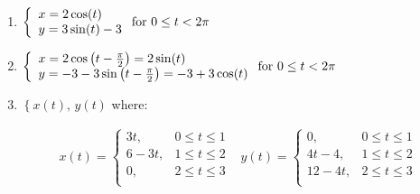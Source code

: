 \documentclass{ximera}
\begin{document}
\begin{enumerate}
\setcounter{enumi}{\value{HW}}

\item   ${\displaystyle \left\{ \begin{array}{l} x = 2\cos(t) \\ y = 3\sin(t)-3  \end{array} \right. \vspace{.25in} \mbox{for } 0 \leq t < 2\pi }$

\item  ${\displaystyle \left\{ \begin{array}{l} x = 2\cos\left(t-\frac{\pi}{2}\right) = 2\sin(t) \\ y = -3 - 3\sin\left(t-\frac{\pi}{2}\right) =  -3+3\cos(t) \end{array} \right. \vspace{.25in} \mbox{for } 0 \leq t <  2\pi}$

\item  $\left\{ x(t), \, y(t) \right.$ where:

\[ \begin{array}{cc}

x(t) = \left\{ \begin{array}{rr}  3t,& 0 \leq t \leq 1 \\
																	6-3t, & 1 \leq t \leq 2 \\
																	0, & 2 \leq t \leq 3 \\ \end{array} \right.
&

y(t) = \left\{ \begin{array}{rr}  0,& 0 \leq t \leq 1 \\
																	4t-4, & 1 \leq t \leq 2 \\
																	12-4t, & 2 \leq t \leq 3 \\ \end{array} \right.



\end{array}\]


\setcounter{HW}{\value{enumi}}
\end{enumerate}
\end{document}
